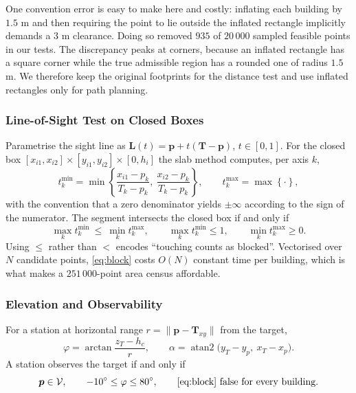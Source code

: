 \documentclass[12pt]{article}
\begin{document}
One convention error is easy to make here and costly: inflating each building by $1.5$ m and then requiring the point to lie outside the inflated rectangle implicitly demands a $3$ m clearance. Doing so removed $935$ of $20\,000$ sampled feasible points in our tests. The discrepancy peaks at corners, because an inflated rectangle has a square corner while the true admissible region has a rounded one of radius $1.5$ m. We therefore keep the original footprints for the distance test and use inflated rectangles only for path planning.

\subsubsection{Line-of-Sight Test on Closed Boxes}

Parametrise the sight line as $\bm L(t)=\bm p+t(\bm T-\bm p)$, $t\in[0,1]$. For the closed box $[x_{i1},x_{i2}]\times[y_{i1},y_{i2}]\times[0,h_i]$ the slab method computes, per axis $k$,
\begin{equation}
\label{eq:slab}
t_k^{\min}=\min\!\left\{\frac{x_{i1}-p_k}{T_k-p_k},\ \frac{x_{i2}-p_k}{T_k-p_k}\right\},\qquad
t_k^{\max}=\max\!\left\{\cdot\right\},
\end{equation}
with the convention that a zero denominator yields $\pm\infty$ according to the sign of the numerator. The segment intersects the closed box if and only if
\begin{equation}
\label{eq:block}
\max_k t_k^{\min}\ \le\ \min_k t_k^{\max},
\qquad
\max_k t_k^{\min}\le 1,
\qquad
\min_k t_k^{\max}\ge 0 .
\end{equation}
Using $\le$ rather than $<$ encodes ``touching counts as blocked''. Vectorised over $N$ candidate points, \eqref{eq:block} costs $O(N)$ constant time per building, which is what makes a $251\,000$-point area census affordable.

\subsubsection{Elevation and Observability}

For a station at horizontal range $r=\|\bm p-\bm T_{xy}\|$ from the target,
\begin{equation}
\label{eq:el}
\varphi=\arctan\frac{z_T-h_c}{r},\qquad
\alpha=\operatorname{atan2}\!\big(y_T-y_p,\ x_T-x_p\big).
\end{equation}
A station observes the target if and only if
\begin{equation}
\label{eq:obs}
\bm p\in\mathcal V,\qquad -10^\circ\le\varphi\le80^\circ,\qquad
\eqref{eq:block}\ \text{false for every building}.
\end{equation}
\end{document}
